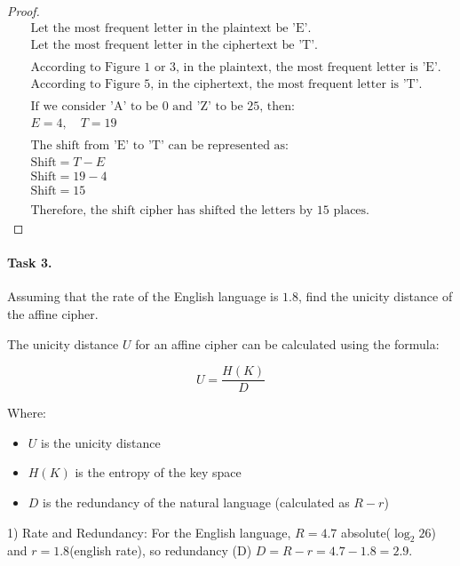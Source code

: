 \documentclass{article}
\begin{document}
\begin{enumerate}
\begin{minipage}{\linewidth}
\begin{proof}
\begin{align*}
              &\text{Let the most frequent letter in the plaintext be 'E'.} \\
              &\text{Let the most frequent letter in the ciphertext be 'T'.} \\
              & \\
              &\text{According to Figure 1 or 3, in the plaintext, the most frequent letter is 'E'.} \\
              &\text{According to Figure 5, in the ciphertext, the most frequent letter is 'T'.} \\
              & \\
              &\text{If we consider 'A' to be 0 and 'Z' to be 25, then:} \\
              &E = 4, \quad T = 19 \\
              & \\
              &\text{The shift from 'E' to 'T' can be represented as:} \\
              &\text{Shift} = T - E \\
              &\text{Shift} = 19 - 4 \\
              &\text{Shift} = 15 \\
              & \\
              &\text{Therefore, the shift cipher has shifted the letters by 15 places.}
            \end{align*}
          \end{proof}
    \end{minipage}
\end{enumerate}


\paragraph{Task 3.} Assuming that the rate of the English language is \(1.8\), find the unicity distance of the affine cipher.

The unicity distance \( U \) for an affine cipher can be calculated using the formula:

\[
  U = \frac{H(K)}{D}
\]

Where:
\begin{itemize}
  \item \( U \) is the unicity distance
  \item \( H(K) \) is the entropy of the key space
  \item \( D \) is the redundancy of the natural language (calculated as \( R - r \))
\end{itemize}
1) Rate and Redundancy:
For the English language, \( R = 4.7 \) absolute($\log_2 26$) and \( r = 1.8 \)(english rate), so redundancy (D) \( D = R - r = 4.7 - 1
.8 = 2.9 \).
\end{document}
